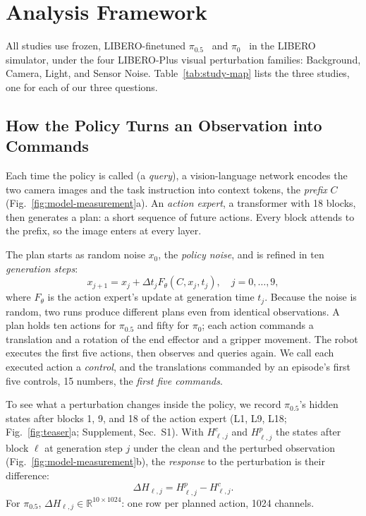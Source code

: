 \section{Analysis Framework}
\label{sec:setup}
All studies use frozen, LIBERO-finetuned $\pi_{0.5}$~\cite{pi05} and $\pi_0$~\cite{pi0} in the LIBERO simulator, under the four LIBERO-Plus visual perturbation families: Background, Camera, Light, and Sensor Noise. Table~\ref{tab:study-map} lists the three studies, one for each of our three questions.



\subsection{How the Policy Turns an Observation into Commands}
\label{sec:generation}
Each time the policy is called (a \emph{query}), a vision-language network encodes the two camera images and the task instruction into context tokens, the \emph{prefix} $C$ (Fig.~\ref{fig:model-measurement}a). An \emph{action expert}, a transformer with 18 blocks, then generates a plan: a short sequence of future actions. Every block attends to the prefix, so the image enters at every layer.

The plan starts as random noise $x_0$, the \emph{policy noise}, and is refined in ten \emph{generation steps}:
\begin{equation}
x_{j+1}=x_j+\Delta t_j F_\theta(C,x_j,t_j),\quad j=0,\ldots,9,
\label{eq:generation}
\end{equation}
where $F_\theta$ is the action expert's update at generation time $t_j$. Because the noise is random, two runs produce different plans even from identical observations. A plan holds ten actions for $\pi_{0.5}$ and fifty for $\pi_0$; each action commands a translation and a rotation of the end effector and a gripper movement. The robot executes the first five actions, then observes and queries again. We call each executed action a \emph{control}, and the translations commanded by an episode's first five controls, 15 numbers, the \emph{first five commands}.

To see what a perturbation changes inside the policy, we record $\pi_{0.5}$'s hidden states after blocks 1, 9, and 18 of the action expert (L1, L9, L18; Fig.~\ref{fig:teaser}a; Supplement, Sec.~S1). With $H^c_{\ell,j}$ and $H^p_{\ell,j}$ the states after block $\ell$ at generation step $j$ under the clean and the perturbed observation (Fig.~\ref{fig:model-measurement}b), the \emph{response} to the perturbation is their difference:
\begin{equation}
\Delta H_{\ell,j}=H^p_{\ell,j}-H^c_{\ell,j}.
\label{eq:response}
\end{equation}
For $\pi_{0.5}$, $\Delta H_{\ell,j}\in\mathbb R^{10\times1024}$: one row per planned action, 1024 channels.

